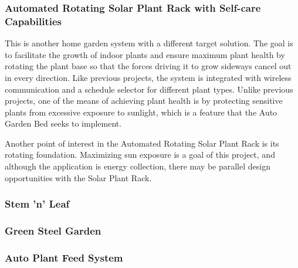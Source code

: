 \subsubsection{Automated Rotating Solar Plant Rack with Self-care Capabilities}

This is another home garden system with a different target solution. The goal is to facilitate the growth of indoor plants and ensure maximum plant health by rotating the plant base so that the forces driving it to grow sideways cancel out in every direction. Like previous projects, the system is integrated with wireless communication and a schedule selector for different plant types. Unlike previous projects, one of the means of achieving plant health is by protecting sensitive plants from excessive exposure to sunlight, which is a feature that the Auto Garden Bed seeks to implement. 

Another point of interest in the Automated Rotating Solar Plant Rack is its rotating foundation. Maximizing sun exposure is a goal of this project, and although the application is energy collection, there may be parallel design opportunities with the Solar Plant Rack.


\subsubsection{Stem 'n' Leaf}

\subsubsection{Green Steel Garden}

\subsubsection{Auto Plant Feed System}


